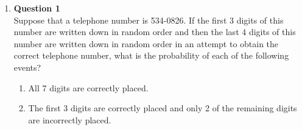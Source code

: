 \documentclass{uofa-eng-assignment}
\begin{document}
 \maketitle
\begin{enumerate}
    \item[]
        \textbf{Question 1} \\
        Suppose that a telephone number is 534-0826. If the first 3 digits of this number are written
        down in random order and then the last 4 digits of this number are written down in random order
        in an attempt to obtain the correct telephone number, what is the probability of each of the
        following events?
        \begin{enumerate}
            \item All 7 digits are correctly placed.
            \item The first 3 digits are correctly placed and only 2 of the remaining digits are
                  incorrectly placed.
        \end{enumerate}


\end{enumerate}
\end{document}

